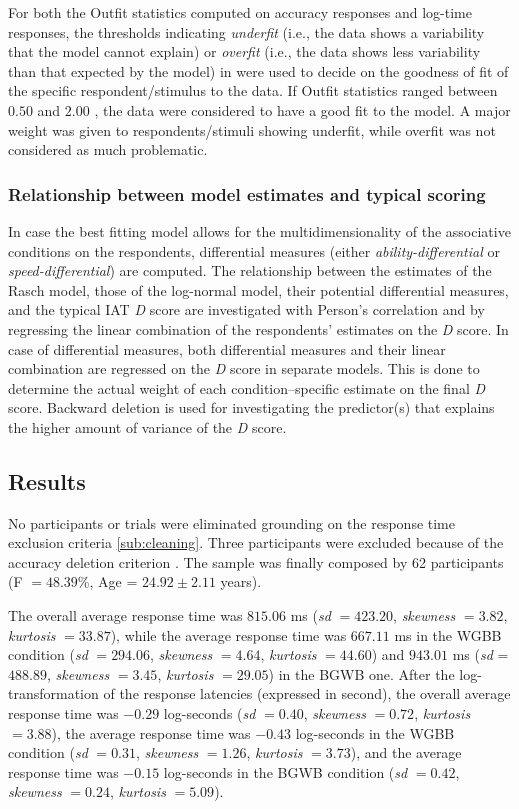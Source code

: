 \documentclass[12pt]{book}
\begin{document}
For both the Outfit statistics computed on accuracy responses and log-time responses, the thresholds indicating \emph{underfit} (i.e., the data shows a variability that the model cannot explain) or \emph{overfit} (i.e., the data shows less variability than that expected by the model) in  were used to decide on the goodness of fit of the specific respondent/stimulus to the data. 
If Outfit statistics ranged between $0.50$ and $2.00$ \cite{linacre2002}, the data were considered to have a good fit to the model. 
A major weight was given to respondents/stimuli showing underfit, while overfit was not considered as much problematic. 

\subsubsection{Relationship between model estimates and typical scoring}

In case the best fitting model allows for the multidimensionality of the associative conditions on the respondents, differential measures (either \emph{ability-differential} or \emph{speed-differential}) are computed. 
The relationship between the estimates of the Rasch model, those of the log-normal model, their potential differential measures, and the typical IAT \emph{D} score are investigated with Person's correlation and by regressing the linear combination of the respondents' estimates on the \emph{D} score. 
In case of differential measures, both differential measures and their linear combination are regressed on the \emph{D} score in separate models. 
This is done to determine the actual weight of each condition--specific estimate on the final \emph{D} score. 
Backward deletion is used for investigating the predictor(s) that explains the higher amount of variance of the \emph{D} score. 


\subsection{Results}
No participants or trials were eliminated grounding on the response time exclusion criteria \ref{sub:cleaning}. Three participants were excluded because of the accuracy deletion criterion \cite{Nosek2002}. 
The sample was finally composed by 62 participants (F $=48.39$\%, Age = $24.92\pm2.11$ years).

The overall average response time was $815.06$ ms (\emph{sd} $= 423.20$, \emph{skewness} $= 3.82$, \emph{kurtosis} $= 33.87$), while the average response time  was $667.11$ ms in the
WGBB condition (\emph{sd} $= 294.06$, \emph{skewness} $= 4.64$, \emph{kurtosis} $= 44.60$) and $943.01$ ms (\emph{sd} = $488.89$, \emph{skewness} $= 3.45$, \emph{kurtosis} $= 29.05$) in the BGWB one. 
After the log-transformation of the response latencies (expressed in second), the overall average response time was $-0.29$ log-seconds (\emph{sd} $= 0.40$, \emph{skewness} $= 0.72$, \emph{kurtosis} $= 3.88$), the average response time was $-0.43$ log-seconds in the WGBB condition (\emph{sd} $= 0.31$, \emph{skewness} $= 1.26$, \emph{kurtosis} $= 3.73$), and the average response time was $-0.15$ log-seconds in the BGWB condition (\emph{sd} $= 0.42$, \emph{skewness} $= 0.24$, \emph{kurtosis} $= 5.09$).
\end{document}
